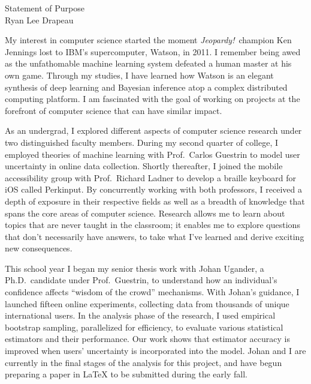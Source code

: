 \documentclass[12pt]{article}
\begin{document}
\begin{center}
    {\Large Statement of Purpose}\\[1 mm]
    {\large Ryan Lee Drapeau}
\end{center}\vspace{-2 mm}

My interest in computer science started the moment {\it{Jeopardy!}}\ champion Ken Jennings lost to IBM's supercomputer, Watson, in 2011. I remember being awed as the unfathomable machine learning system defeated a human master at his own game. Through my studies, I have learned how Watson is an elegant synthesis of deep learning and Bayesian inference atop a complex distributed computing platform. I am fascinated with the goal of working on projects at the forefront of computer science that can have similar impact.\vspace{2 mm}

As an undergrad, I explored different aspects of computer science research under two distinguished faculty members. During my second quarter of college, I employed theories of machine learning with Prof.\ Carlos Guestrin to model user uncertainty in online data collection. Shortly thereafter, I joined the mobile accessibility group with Prof.\ Richard Ladner to develop a braille keyboard for iOS called Perkinput. By concurrently working with both professors, I received a depth of exposure in their respective fields as well as a breadth of knowledge that spans the core areas of computer science. Research allows me to learn about topics that are never taught in the classroom; it enables me to explore questions that don't necessarily have answers, to take what I've learned and derive exciting new consequences.\vspace{2 mm}

This school year I began my senior thesis work with Johan Ugander, a Ph.D.\ candidate under Prof.\ Guestrin, to understand how an individual's confidence affects ``wisdom of the crowd'' mechanisms. With Johan's guidance, I launched fifteen online experiments, collecting data from thousands of unique international users. In the analysis phase of the research, I used empirical bootstrap sampling, parallelized for efficiency, to evaluate various statistical estimators and their performance. Our work shows that estimator accuracy is improved when users' uncertainty is incorporated into the model. Johan and I are currently in the final stages of the analysis for this project, and have begun preparing a paper in \LaTeX{} to be submitted during the early fall.\vspace{2 mm}
\end{document}
